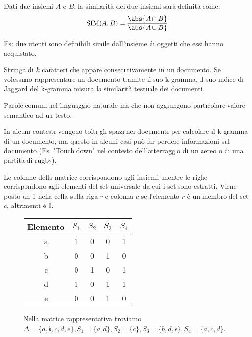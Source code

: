 \documentclass[\main/main.tex]{subfiles}
\begin{document}
\begin{definition}
  Dati due insiemi $A$ e $B$, la similarità dei due insiemi sarà definita come:
  \[
    \text{SIM}(A, B) = \dfrac{\abs{A \cap B}}{\abs{A \cup B}}
  \]
\end{definition}

Es: due utenti sono definibili simile dall'insieme di oggetti che essi hanno acquistato.

\begin{definition}
  Stringa di $k$ caratteri che appare consecutivamente in un documento. Se volessimo rappresentare un documento tramite il suo k-gramma, il suo indice di Jaggard del k-gramma misura la similarità testuale dei documenti.
\end{definition}

\begin{definition}
  Parole comuni nel linguaggio naturale ma che non aggiungono particolare valore semantico ad un testo.
\end{definition}

In alcuni contesti vengono tolti gli spazi nei documenti per calcolare il k-gramma di un documento, ma questo in alcuni casi può far perdere informazioni sul documento (Es: "Touch down" nel contesto dell'atterraggio di un aereo o di una partita di rugby).

\begin{definition}
  Le colonne della matrice corrispondono agli insiemi, mentre le righe corrispondono agli elementi del set universale da cui i set sono estratti. Viene posto un 1 nella cella sulla riga $r$ e colonna $c$ se l'elemento $r$ è un membro del set $c$, altrimenti è 0.

  \begin{figure}[H]
    \begin{center}
      \begin{tabular}{c|c|c|c|c}
        Elemento & $S_1$ & $S_2$ & $S_3$ & $S_4$ \\
        \hline
        \hline
        a        & 1     & 0     & 0     & 1     \\
        b        & 0     & 0     & 1     & 0     \\
        c        & 0     & 1     & 0     & 1     \\
        d        & 1     & 0     & 1     & 1     \\
        e        & 0     & 0     & 1     & 0     \\
      \end{tabular}
    \end{center}
    \caption{Nella matrice rappresentativa troviamo $\Delta = \{a,b,c,d,e\}, S_1 = \{a,d\}, S_2 = \{c\}, S_3 = \{b,d,e\}, S_4 = \{a,c,d\}$.}
  \end{figure}
\end{definition}
\end{document}
